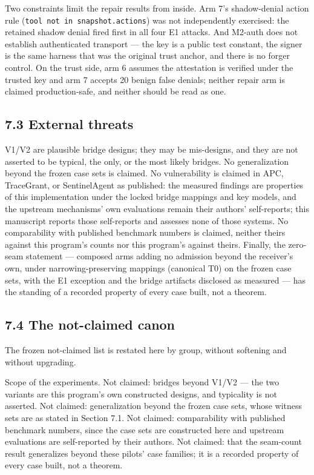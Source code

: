 \documentclass[
  10pt,
]{article}
\newcounter{none} %
\renewcommand{\_}{\origunderscore\allowbreak}
\begin{document}
Two constraints limit the repair results from inside. Arm 7's
shadow-denial action rule (\texttt{tool\ not\ in\ snapshot.actions}) was
not independently exercised: the retained shadow denial fired first in
all four E1 attacks. And M2-auth does not establish authenticated
transport --- the key is a public test constant, the signer is the same
harness that was the original trust anchor, and there is no forger
control. On the trust side, arm 6 assumes the attestation is verified
under the trusted key and arm 7 accepts 20 benign false denials; neither
repair arm is claimed production-safe, and neither should be read as
one.

\subsection{7.3 External threats}\label{external-threats}

V1/V2 are plausible bridge designs; they may be mis-designs, and they
are not asserted to be typical, the only, or the most likely bridges. No
generalization beyond the frozen case sets is claimed. No vulnerability
is claimed in APC, TraceGrant, or SentinelAgent as published: the
measured findings are properties of this implementation under the locked
bridge mappings and key models, and the upstream mechanisms' own
evaluations remain their authors' self-reports; this manuscript reports
those self-reports and assesses none of those systems. No comparability
with published benchmark numbers is claimed, neither theirs against this
program's counts nor this program's against theirs. Finally, the
zero-seam statement --- composed arms adding no admission beyond the
receiver's own, under narrowing-preserving mappings (canonical T0) on
the frozen case sets, with the E1 exception and the bridge artifacts
disclosed as measured --- has the standing of a recorded property of
every case built, not a theorem.

\subsection{7.4 The not-claimed canon}\label{the-not-claimed-canon}

The frozen not-claimed list is restated here by group, without softening
and without upgrading.

Scope of the experiments. Not claimed: bridges beyond V1/V2 --- the two
variants are this program's own constructed designs, and typicality is
not asserted. Not claimed: generalization beyond the frozen case sets,
whose witness sets are as stated in Section 7.1. Not claimed:
comparability with published benchmark numbers, since the case sets are
constructed here and upstream evaluations are self-reported by their
authors. Not claimed: that the seam-count result generalizes beyond
these pilots' case families; it is a recorded property of every case
built, not a theorem.
\end{document}
